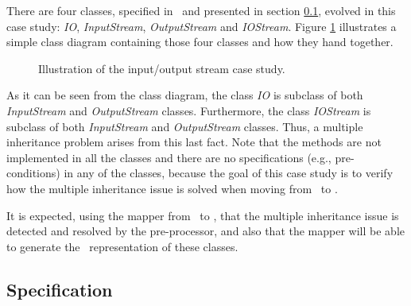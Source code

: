 There are four classes, specified in \vpp\ and presented in section \ref{chap6:case2:spec}, evolved in this case study: \textit{IO}, \textit{InputStream}, \textit{OutputStream} and \textit{IOStream}. Figure \ref{chap6:case2:diam} illustrates a simple class diagram containing those four classes and how they hand together.

\begin{figure}[!htb]
\begin{center}
\end{center}
\caption{Illustration of the input/output stream case study.}
\label{chap6:case2:diam}
\end{figure}

As it can be seen from the class diagram, the class \textit{IO} is subclass of both \textit{InputStream} and \textit{OutputStream} classes. Furthermore, the class \textit{IOStream} is subclass of both \textit{InputStream} and \textit{OutputStream} classes. Thus, a multiple inheritance problem arises from this last fact. Note that the methods are not implemented in all the classes and there are no specifications (e.g., pre-conditions) in any of the classes, because the goal of this case study is to verify how the multiple inheritance issue is solved when moving from \vpp\ to \jml.

It is expected, using the mapper from \vpp\ to \jml, that the multiple inheritance issue is detected and resolved by the pre-processor, and also that the mapper will be able to generate the \jml\ representation of these classes.


\subsection{Specification}
\label{chap6:case2:spec}


